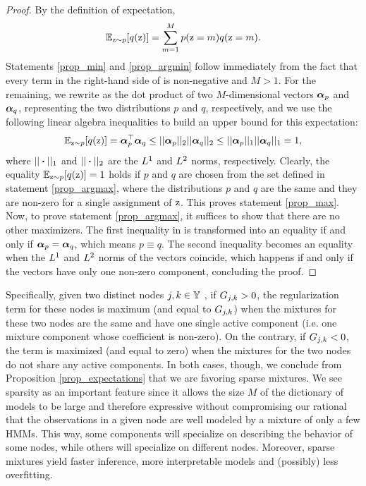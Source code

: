 \begin{proof}
	By the definition of expectation,
	\begin{equation}
	\label{prop_expdef}
	\mathbb{E}_{{\textnormal{z}}\sim p} [ q({\textnormal{z}}) ] = \sum_{m=1}^M p({\textnormal{z}}=m) q({\textnormal{z}}=m).
	\end{equation}
	Statements \ref{prop_min} and \ref{prop_argmin} follow immediately from the fact that every term in the right-hand side of  is non-negative and $M>1$. For the remaining, we rewrite  as the dot product of two $M$-dimensional vectors ${\bm{\alpha}}_p$ and ${\bm{\alpha}}_q$, representing the two distributions $p$ and $q$, respectively, and we use the following linear algebra inequalities to build an upper bound for this expectation:
	\begin{equation}
	\label{prop_ineq}
	\mathbb{E}_{{\textnormal{z}}\sim p} [ q({\textnormal{z}}) ] = {\bm{\alpha}}_p ^\top {\bm{\alpha}}_q \leq || {\bm{\alpha}}_p ||_2 || {\bm{\alpha}}_q ||_2 \leq || {\bm{\alpha}}_p ||_1 || {\bm{\alpha}}_q ||_1 =1,
	\end{equation}
	where $||\boldsymbol{\cdot}||_1$ and $||\boldsymbol{\cdot}||_2$ are the $L^1$ and $L^2$ norms, respectively. Clearly, the equality $\mathbb{E}_{{\textnormal{z}}\sim p} [ q({\textnormal{z}}) ] = 1$ holds if $p$ and $q$ are chosen from the set defined in statement \ref{prop_argmax}, where the distributions $p$ and $q$ are the same and they are non-zero for a single assignment of ${\textnormal{z}}$. This proves statement \ref{prop_max}. Now, to prove statement \ref{prop_argmax}, it suffices to show that there are no other maximizers. The first inequality in  is transformed into an equality if and only if ${\bm{\alpha}}_p = {\bm{\alpha}}_q$, which means $p \equiv q$. The second inequality becomes an equality when the $L^1$ and $L^2$ norms of the vectors coincide, which happens if and only if the vectors have only one non-zero component, concluding the proof.
\end{proof}
Specifically, given two distinct nodes $j, k \in {\mathbb{Y}}$ , if ${G}_{j,k} > 0$, the regularization term for these nodes is maximum (and equal to ${G}_{j,k}$) when the mixtures for these two nodes are the same and have one single active component (i.e. one mixture component whose coefficient is non-zero). On the contrary, if ${G}_{j,k} < 0$, the term is maximized (and equal to zero) when the mixtures for the two nodes do not share any active components. In both cases, though, we conclude from Proposition \ref{prop_expectations} that we are favoring sparse mixtures. We see sparsity as an important feature since it allows the size $M$ of the dictionary of models to be large and therefore expressive without compromising our rational that the observations in a given node are well modeled by a mixture of only a few HMMs. This way, some components will specialize on describing the behavior of some nodes, while others will specialize on different nodes. Moreover, sparse mixtures yield faster inference, more interpretable models and (possibly) less overfitting.
